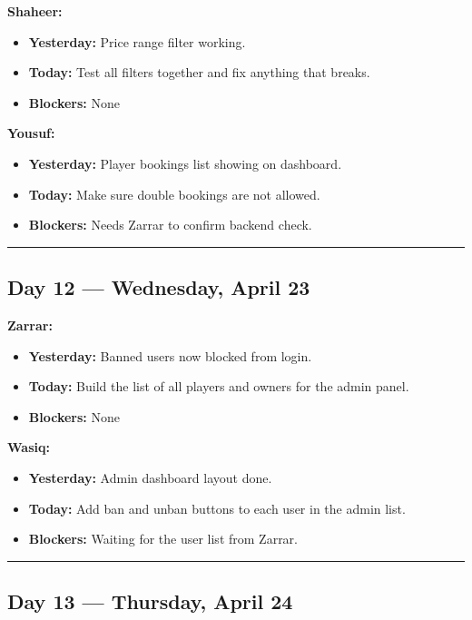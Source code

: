 \documentclass[12pt,a4paper]{article}
\begin{document}
\textbf{Shaheer:}
\begin{itemize}[noitemsep]
    \item \textbf{Yesterday:} Price range filter working.
    \item \textbf{Today:} Test all filters together and fix anything that breaks.
    \item \textbf{Blockers:} None
\end{itemize}

\textbf{Yousuf:}
\begin{itemize}[noitemsep]
    \item \textbf{Yesterday:} Player bookings list showing on dashboard.
    \item \textbf{Today:} Make sure double bookings are not allowed.
    \item \textbf{Blockers:} Needs Zarrar to confirm backend check.
\end{itemize}

\vspace{1em}\hrule\vspace{1em}

\subsection*{Day 12 --- Wednesday, April 23}

\textbf{Zarrar:}
\begin{itemize}[noitemsep]
    \item \textbf{Yesterday:} Banned users now blocked from login.
    \item \textbf{Today:} Build the list of all players and owners for the admin panel.
    \item \textbf{Blockers:} None
\end{itemize}

\textbf{Wasiq:}
\begin{itemize}[noitemsep]
    \item \textbf{Yesterday:} Admin dashboard layout done.
    \item \textbf{Today:} Add ban and unban buttons to each user in the admin list.
    \item \textbf{Blockers:} Waiting for the user list from Zarrar.
\end{itemize}

\vspace{1em}\hrule\vspace{1em}

\newpage

\subsection*{Day 13 --- Thursday, April 24}
\end{document}
